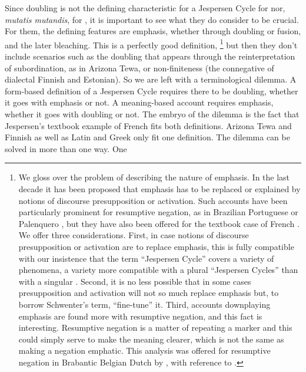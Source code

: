 ﻿\documentclass[output=paper,draft,draftmode,colorlinks,citecolor=brown]{langscibook}
\begin{document}
Since doubling is not the defining characteristic for a Jespersen Cycle for
\textcites{Chatzopoulou2012}{Chatzopoulou2015}{Chatzopoulou2019} nor,
\textit{mutatis mutandis},
for \textcites{Schwegler1983}{Schwegler1988}, it is important to see what they do consider to
be crucial. For them, the defining features are emphasis, whether through
doubling or fusion, and the later bleaching. This is a perfectly good
definition,%
%
    \footnote{We gloss over the problem of describing the nature of
    emphasis. In the last decade it has been proposed that emphasis has to
    be replaced or explained by notions of discourse presupposition or
    activation.  Such accounts have been particularly prominent for
    resumptive negation, as in Brazilian Portuguese
    \parencite{Schwenter2006} or Palenquero \parencite{Schwegler1991}, but
    they have also been offered for the textbook case of French
    \parencites{MosegaardHansen2009}{Larrivee2010}. We offer three
    considerations. First, in case notions of discourse presupposition or
    activation are to replace emphasis, this is fully compatible with our
    insistence that the term ``Jespersen Cycle'' covers a variety of
    phenomena, a variety more compatible with a plural ``Jespersen Cycles''
    than with a singular \parencite{Auwera2009}. Second, it is no less
    possible that in some cases presupposition and activation will not so
    much replace emphasis but, to borrow Schwenter's term, ``fine-tune''
    it. Third, accounts downplaying emphasis are found more with resumptive
    negation, and this fact is interesting. Resumptive negation is a matter
    of repeating a marker and this could simply serve to make the meaning
    clearer, which is not the same as making a negation emphatic. This
    analysis was offered for resumptive negation in Brabantic Belgian Dutch
    by \textcite[52]{Auwera2009}, with reference to
    \textcite[76]{Pauwels1974}.} %
%
but then they don't include scenarios such as the doubling that appears
through the reinterpretation of subordination, as in Arizona Tewa,
or non-finiteness (the connegative of dialectal Finnish and
Estonian). So we are left with a terminological
dilemma. A form-based definition of a Jespersen Cycle requires there to be
doubling, whether it goes with emphasis or not. A meaning-based account
requires emphasis, whether it goes with doubling or not. The embryo of the
dilemma is the fact that Jespersen's textbook example of French fits both
definitions. Arizona Tewa and Finnish as well as Latin and Greek only fit
one definition. The dilemma can be solved in more than one way. One
\end{document}
